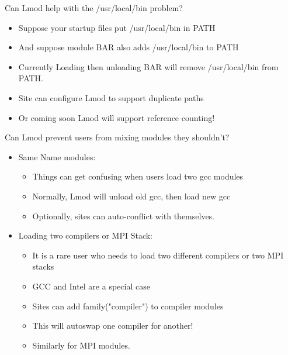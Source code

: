 \documentclass{beamer}
\begin{document}
\begin{frame}{Can Lmod help with the /usr/local/bin problem?}
  \begin{itemize}
    \item Suppose your startup files put /usr/local/bin in PATH
    \item And suppose module BAR also adds /usr/local/bin to PATH
    \item Currently Loading then unloading BAR will remove
      /usr/local/bin from PATH. 
    \item Site can configure Lmod to support duplicate paths
    \item Or coming soon Lmod will support reference counting!
  \end{itemize}
\end{frame}

\begin{frame}{Can Lmod prevent users from mixing modules they shouldn't?}
  \begin{itemize}
      \item Same Name modules:
      \begin{itemize}
        \item Things can get confusing when users load two gcc modules
        \item Normally, Lmod will unload old gcc, then load new gcc
        \item Optionally, sites can auto-conflict with themselves.
      \end{itemize}
    \item Loading two compilers or MPI Stack:
      \begin{itemize}
        \item It is a rare user who needs to load two different
          compilers or two MPI stacks
        \item GCC and Intel are a special case
        \item Sites can add family("compiler") to compiler modules
        \item This will autoswap one compiler for another!
        \item Similarly for MPI modules.
      \end{itemize}
  \end{itemize}
\end{frame}
\end{document}
